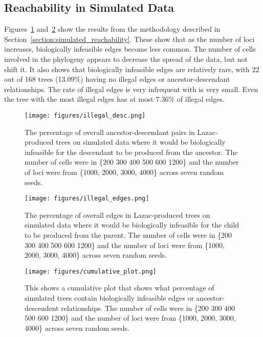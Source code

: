 \subsection{Reachability in Simulated Data}\label{section:simulated_reachability_res}

Figures~\ref{fig:illegal_desc} and~\ref{fig:illegal_edges} show the results from the methodology described in Section~\ref{section:simulated_reachability}. These show that as the number of loci increases, biologically infeasible edges become less common. The number of cells involved in the phylogeny appears to decrease the spread of the data, but not shift it. It also shows that biologically infeasible edges are relatively rare, with 22 out of 168 trees (13.09\%) having no illegal edges or ancestor-descendant relationships. The rate of illegal edges is very infrequent with is very small. Even the tree with the most illegal edges has at most 7.36\% of illegal edges. 

\begin{figure}[ht]
    \centering
    \texttt{[image: figures/illegal\_desc.png]} 
    \caption{The percentage of overall ancestor-descendant pairs in Lazac-produced trees on simulated data where it would be biologically infeasible for the descendant to be produced from the ancestor. The number of cells were in \{200 300 400 500 600 1200\} and the number of loci were from \{1000, 2000, 3000, 4000\} across seven random seeds.}\label{fig:illegal_desc}
\end{figure}

\begin{figure}[ht]
    \centering
    \texttt{[image: figures/illegal\_edges.png]}
    \caption{The percentage of overall edges in Lazac-produced trees on simulated data where it would be biologically infeasible for the child to be produced from the parent. The number of cells were in \{200 300 400 500 600 1200\} and the number of loci were from \{1000, 2000, 3000, 4000\} across seven random seeds.}\label{fig:illegal_edges}
\end{figure}

\begin{figure}[ht]
    \centering
    \texttt{[image: figures/cumulative\_plot.png]}
    \caption{This shows a cumulative plot that shows what percentage of simulated trees contain biologically infeasible edges or ancestor-descendent relationships. The number of cells were in \{200 300 400 500 600 1200\} and the number of loci were from \{1000, 2000, 3000, 4000\} across seven random seeds.}\label{fig:cumulative_trees}
\end{figure}

